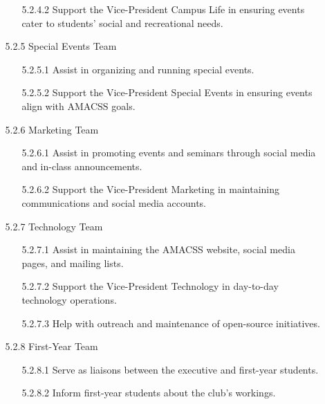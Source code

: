 \documentclass[12pt,a4paper]{article}
\begin{document}
\begin{enumerate}
\begin{enumerate}
\begin{enumerate}
\item[5.2.4.2] Support the Vice-President Campus Life in ensuring events cater to students' social and recreational needs.
\end{enumerate}

\item[5.2.5] Special Events Team

\begin{enumerate}
\item[5.2.5.1] Assist in organizing and running special events.

\item[5.2.5.2] Support the Vice-President Special Events in ensuring events align with AMACSS goals.
\end{enumerate}

\item[5.2.6] Marketing Team

\begin{enumerate}
\item[5.2.6.1] Assist in promoting events and seminars through social media and in-class announcements.

\item[5.2.6.2] Support the Vice-President Marketing in maintaining communications and social media accounts.
\end{enumerate}

\item[5.2.7] Technology Team

\begin{enumerate}
\item[5.2.7.1] Assist in maintaining the AMACSS website, social media pages, and mailing lists.

\item[5.2.7.2] Support the Vice-President Technology in day-to-day technology operations.

\item[5.2.7.3] Help with outreach and maintenance of open-source initiatives.
\end{enumerate}

\item[5.2.8] First-Year Team

\begin{enumerate}
\item[5.2.8.1] Serve as liaisons between the executive and first-year students.

\item[5.2.8.2] Inform first-year students about the club's workings.


\end{enumerate}
\end{enumerate}
\end{enumerate}
\end{document}
